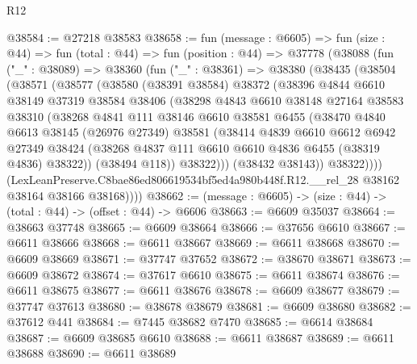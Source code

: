 \begin{lexlean}{R12}
\begin{coremodule}
@38584 := @27218 @38583
@38658 := fun (message : @6605) =>
  fun (size : @44) =>
  fun (total : @44) =>
  fun (position : @44) =>
  @37778
    (@38088
      (fun ("_" : @38089) =>
      @38360
        (fun ("_" : @38361) =>
        @38380
          (@38435
            (@38504
              (@38571
                (@38577
                  (@38580
                    (@38391 @38584)
                    @38372
                    (@38396
                      @4844
                      @6610
                      @38149
                      @37319
                      @38584
                      @38406
                      (@38298
                        @4843
                        @6610
                        @38148
                        @27164
                        @38583
                        @38310
                        (@38268
                          @4841
                          @111
                          @38146
                          @6610
                          @38581
                          @6455
                          (@38470
                            @4840
                            @6613
                            @38145
                            (@26976 @27349)
                            @38581
                            (@38414
                              @4839
                              @6610
                              @6612
                              @6942
                              @27349
                              @38424
                              (@38268 @4837 @111 @6610 @6610 @4836 @6455 (@38319 @4836) @38322))
                            (@38494 @118))
                          @38322)))
                    (@38432 @38143))
                  @38322))))
          (LexLeanPreserve.C8bae86ed806619534bf5ed4a980b448f.R12.__rel_28
            @38162
            @38164
            @38166
            @38168))))
@38662 := (message : @6605) -> (size : @44) -> (total : @44) -> (offset : @44) -> @6606
@38663 := @6609 @35037
@38664 := @38663 @37748
@38665 := @6609 @38664
@38666 := @37656 @6610
@38667 := @6611 @38666
@38668 := @6611 @38667
@38669 := @6611 @38668
@38670 := @6609 @38669
@38671 := @37747 @37652
@38672 := @38670 @38671
@38673 := @6609 @38672
@38674 := @37617 @6610
@38675 := @6611 @38674
@38676 := @6611 @38675
@38677 := @6611 @38676
@38678 := @6609 @38677
@38679 := @37747 @37613
@38680 := @38678 @38679
@38681 := @6609 @38680
@38682 := @37612 @441
@38684 := @7445 @38682 @7470
@38685 := @6614 @38684
@38687 := @6609 @38685 @6610
@38688 := @6611 @38687
@38689 := @6611 @38688
@38690 := @6611 @38689

\end{coremodule}
\end{lexlean}
